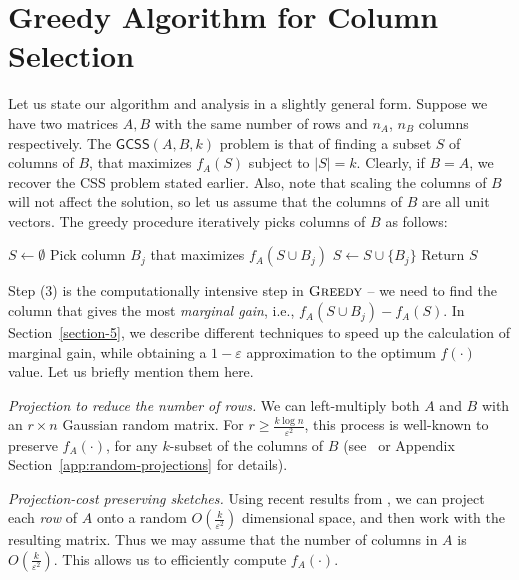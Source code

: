 \documentclass{article}
\newcommand{\Real}{\mathbb{R}}
\newcommand{\eps}{\varepsilon}
\newcommand{\greedy}{\textsc{Greedy}}
\newcommand{\gcss}{\textsf{GCSS}}
\begin{document}
\section{Greedy Algorithm for Column Selection} \label{section-2}

Let us state our algorithm and analysis in a slightly general form. Suppose we have two matrices $A, B$ with the same number of rows and $n_A$, $n_B$ columns respectively. The $\gcss(A, B, k)$ problem is that of finding a subset $S$ of columns of $B$, that maximizes $f_A(S)$ subject to $|S|=k$.
Clearly, if $B = A$, we recover the CSS problem stated earlier. Also, note that scaling the columns of $B$ will not affect the solution, so let us assume that the columns of $B$ are all unit vectors. The greedy procedure iteratively picks columns of $B$ as follows:

\begin{algorithm} \label{alg:greedy}
\caption{$\greedy$($A \! \in \! \Real^{m \times n_A}$, $B \! \in\!  \Real^{m \times n_B}$, $k \leq n_B$)}
\begin{algorithmic}[1]
\STATE $S \leftarrow \emptyset$
\STATE Pick column $B_j$ that maximizes $f_A(S \cup B_j)$
\STATE $S \leftarrow S \cup \{B_j\}$
\ENDFOR
\STATE Return $S$
\end{algorithmic}
\end{algorithm}

Step (3) is the computationally intensive step in $\greedy$ -- we need to find the column that gives the most {\em marginal gain}, i.e., $f_A(S \cup B_j) - f_A(S)$.  In Section~\ref{section-5}, we describe different techniques to speed up the calculation of marginal gain, while obtaining a $1-\eps$ approximation to the optimum $f(\cdot)$ value. Let us briefly mention them here. 

{\em Projection to reduce the number of rows.}  We can left-multiply both $A$ and $B$ with an $r \times n$ Gaussian random matrix.  For $r \ge \frac{k\log n}{\eps^2}$, this process is well-known to preserve $f_A(\cdot)$, for any $k$-subset of the columns of $B$ (see~\cite{Sarlos} or Appendix Section~\ref{app:random-projections} for details).

{\em Projection-cost preserving sketches.}
Using recent results from \cite{Cohen}, we can project each {\em row} of $A$ onto a random $O(\frac{k}{\eps^2})$ dimensional space, and then work with the resulting matrix. Thus we may assume that the number of columns in $A$ is $O(\frac{k}{\eps^2})$. This allows us to efficiently compute $f_A(\cdot)$.
\end{document}
